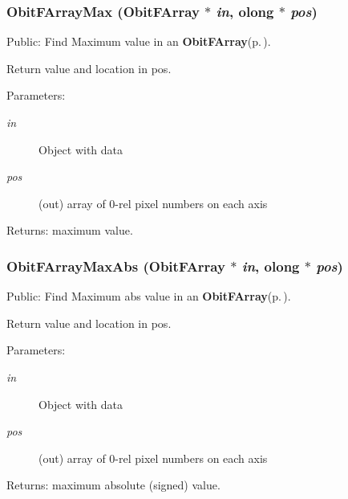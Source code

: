 \subsubsection{ Obit\-FArray\-Max ({\bf Obit\-FArray} $\ast$ {\em in}, {\bf olong} $\ast$ {\em pos})}\label{ObitFArray_8h_a65}


Public: Find Maximum value in an {\bf Obit\-FArray}{\rm (p.\,\pageref{structObitFArray})}. 

Return value and location in pos. \begin{Desc}
\item[Parameters:]
\begin{description}
\item[{\em in}]Object with data \item[{\em pos}](out) array of 0-rel pixel numbers on each axis \end{description}
\end{Desc}
\begin{Desc}
\item[Returns:]maximum value. \end{Desc}
\subsubsection{ Obit\-FArray\-Max\-Abs ({\bf Obit\-FArray} $\ast$ {\em in}, {\bf olong} $\ast$ {\em pos})}\label{ObitFArray_8h_a66}


Public: Find Maximum abs value in an {\bf Obit\-FArray}{\rm (p.\,\pageref{structObitFArray})}. 

Return value and location in pos. \begin{Desc}
\item[Parameters:]
\begin{description}
\item[{\em in}]Object with data \item[{\em pos}](out) array of 0-rel pixel numbers on each axis \end{description}
\end{Desc}
\begin{Desc}
\item[Returns:]maximum absolute (signed) value. \end{Desc}
